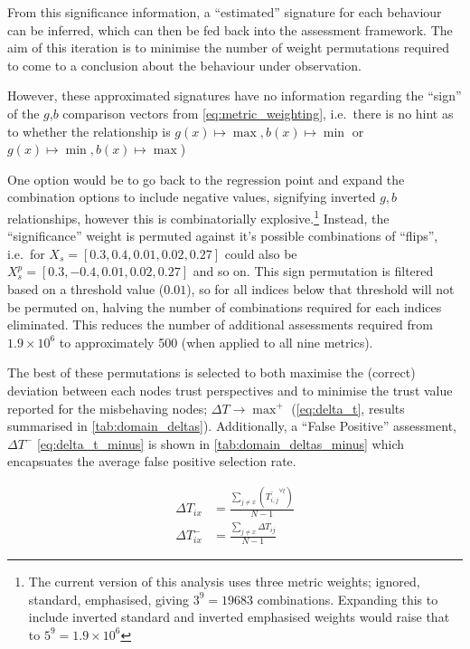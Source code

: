 From this significance information, a ``estimated'' signature for each behaviour can be inferred, which can then be fed back into the assessment framework. 
The aim of this iteration is to minimise the number of weight permutations required to come to a conclusion about the behaviour under observation. 

However, these approximated signatures have no information regarding the ``sign'' of the  $g$,$b$ comparison vectors from \eqref{eq:metric_weighting}, i.e.\ there is no hint as to whether the relationship is $g(x) \mapsto \max, b(x) \mapsto \min$ or $g(x) \mapsto \min, b(x) \mapsto \max$)  

One option would be to go back to the regression point and expand the combination options to include negative values, signifying inverted $g,b$ relationships, however this is combinatorially explosive.\footnote{The current version of this analysis uses three metric weights; ignored, standard, emphasised, giving $3^9 = 19683$ combinations. Expanding this to include inverted standard and inverted emphasised weights would raise that to $5^9 = 1.9\times 10^6$}
Instead, the ``significance'' weight is permuted against it's possible combinations of ``flips'', i.e.\ for $X_s=[0.3,0.4,0.01,0.02,0.27]$ could also be $X_s^p=[0.3,-0.4,0.01,0.02,0.27]$ and so on. 
This sign permutation is filtered based on a threshold value ($0.01$), so for all indices below that threshold will not be permuted on, halving the number of combinations required for each indices eliminated.
This reduces the number of additional assessments required from $1.9\times 10^6$ to approximately 500 (when applied to all nine metrics).

The best of these permutations is selected to both maximise the (correct) deviation between each nodes trust perspectives and to minimise the trust value reported for the misbehaving nodes; $\Delta T \to \max^+$ (\autoref{eq:delta_t}, results summarised in \autoref{tab:domain_deltas}).
Additionally, a ``False Positive'' assessment, $\Delta T^-$ \autoref{eq:delta_t_minus} is shown in \autoref{tab:domain_deltas_minus} which encapsuates the average false positive selection rate.

\begin{align}
  \Delta T_{ix} &= \frac{\sum_{j\neq x}\left( \overline{T_{i,j}}^{\forall t}\right)}{N-1} \label{eq:delta_t}\\
  \Delta T_{ix}^- &= \frac{\sum_{j\neq x} \Delta T_{ij}}{N-1} \label{eq:delta_t_minus} 
\end{align}

